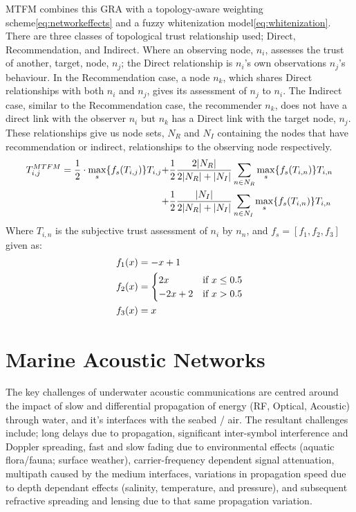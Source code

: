 \documentclass[conference]{IEEEtran}
\begin{document}
MTFM combines this GRA with a topology-aware weighting scheme\eqref{eq:networkeffects} and a fuzzy whitenization model\eqref{eq:whitenization}. There are three classes of topological trust relationship used; Direct, Recommendation, and Indirect.
Where an observing node, $n_i$, assesses the trust of another, target, node, $n_j$; the Direct relationship is $n_i$'s own observations $n_j$'s behaviour.
In the Recommendation case, a node $n_k$, which shares Direct relationships with both $n_i$ and $n_j$, gives its assessment of $n_j$ to $n_i$.
The Indirect case, similar to the Recommendation case, the recommender $n_k$, does not have a direct link with the observer $n_i$ but $n_k$ has a Direct link with the target node, $n_j$.
These relationships give us node sets, $N_R$ and $N_I$ containing the nodes that have recommendation or indirect, relationships to the observing node respectively.
%
\begin{align}
  \label{eq:networkeffects}
  T_{i,j}^{MTFM}=\frac{1}{2} \cdot \max_s\{f_s(T_{i,j})\} T_{i,j}+&\frac{1}{2} \frac{2|N_R| }{2|N_R| + |N_I|}\sum_{n \in N_R} \max_s\{f_s(T_{i,n})\} T_{i,n}\\ \notag
  +&\frac{1}{2} \frac{|N_I| }{2|N_R| + |N_I|}\sum_{n \in N_I} \max_s\{f_s(T_{i,n})\} T_{i,n} 
\end{align}
 Where $T_{i,n}$ is the subjective trust assessment of $n_i$ by $n_n$, and $f_s = [ f_1,f_2, f_3]$ given as:
\begin{align}
  \label{eq:whitenization}
  f_1(x)&= -x+1\notag\\
  f_2(x)&= 
  \begin{cases}
    2x & \text{if }x\leq 0.5\\
    -2x+2 & \text{if }x>0.5
  \end{cases}\\
  f_3(x)&= x\notag
\end{align}
%
\section{Marine Acoustic Networks}\label{sec:marineacousticnetworks}

The key challenges of underwater acoustic communications are centred around the impact of slow and differential propagation of energy (RF, Optical, Acoustic) through water, and it's interfaces with the seabed / air.
The resultant challenges include; long delays due to propagation, significant inter-symbol interference and Doppler spreading, fast and slow fading due to environmental effects (aquatic flora/fauna; surface weather), carrier-frequency dependent signal attenuation, multipath caused by the medium interfaces, variations in propagation speed due to depth dependant effects (salinity, temperature, and pressure), and subsequent refractive spreading and lensing due to that same propagation variation\cite{Partan2006}.
\end{document}
